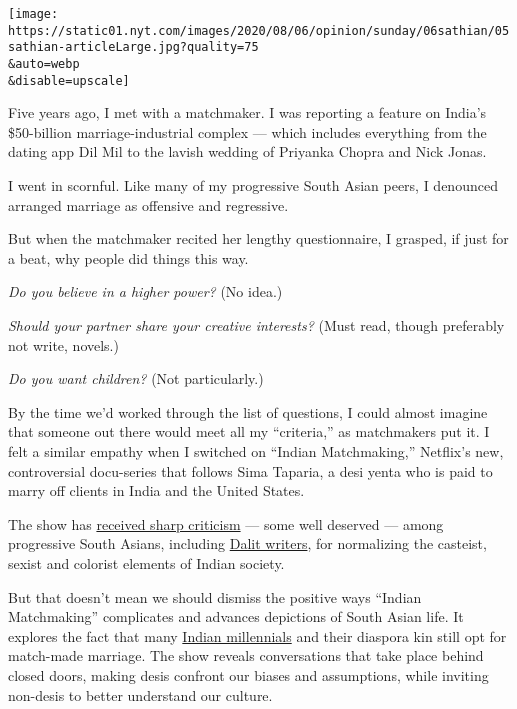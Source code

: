 \texttt{[image: https://static01.nyt.com/images/2020/08/06/opinion/sunday/06sathian/05sathian-articleLarge.jpg?quality=75\\\&auto=webp\\\&disable=upscale]}

Five years ago, I met with a matchmaker. I was reporting a feature on
India's \$50-billion marriage-industrial complex --- which includes
everything from the dating app Dil Mil to the lavish wedding of Priyanka
Chopra and Nick Jonas.

I went in scornful. Like many of my progressive South Asian peers, I
denounced arranged marriage as offensive and regressive.

But when the matchmaker recited her lengthy questionnaire, I grasped, if
just for a beat, why people did things this way.

\emph{Do you believe in a higher power?} (No idea.)

\emph{Should your partner share your creative interests?} (Must read,
though preferably not write, novels.)

\emph{Do you want children?} (Not particularly.)

By the time we'd worked through the list of questions, I could almost
imagine that someone out there would meet all my ``criteria,'' as
matchmakers put it. I felt a similar empathy when I switched on ``Indian
Matchmaking,'' Netflix's new, controversial docu-series that follows
Sima Taparia, a desi yenta who is paid to marry off clients in India and
the United States.

The show has
\href{https://www.npr.org/sections/goatsandsoda/2020/07/26/895008997/netflixs-indian-matchmaking-is-the-talk-of-india-and-not-in-a-good-way}{received
sharp criticism} --- some well deserved --- among progressive South
Asians, including
\href{https://www.theatlantic.com/culture/archive/2020/08/netflix-indian-matchmaking-and-the-shadow-of-caste/614863/}{Dalit
writers}, for normalizing the casteist, sexist and colorist elements of
Indian society.

But that doesn't mean we should dismiss the positive ways ``Indian
Matchmaking'' complicates and advances depictions of South Asian life.
It explores the fact that many
\href{https://www.cnn.com/2018/03/21/world/arranged-marriage-christiane-amanpour-sex-love-around-world-delhi/index.html}{Indian
millennials} and their diaspora kin still opt for match-made marriage.
The show reveals conversations that take place behind closed doors,
making desis confront our biases and assumptions, while inviting
non-desis to better understand our culture.

